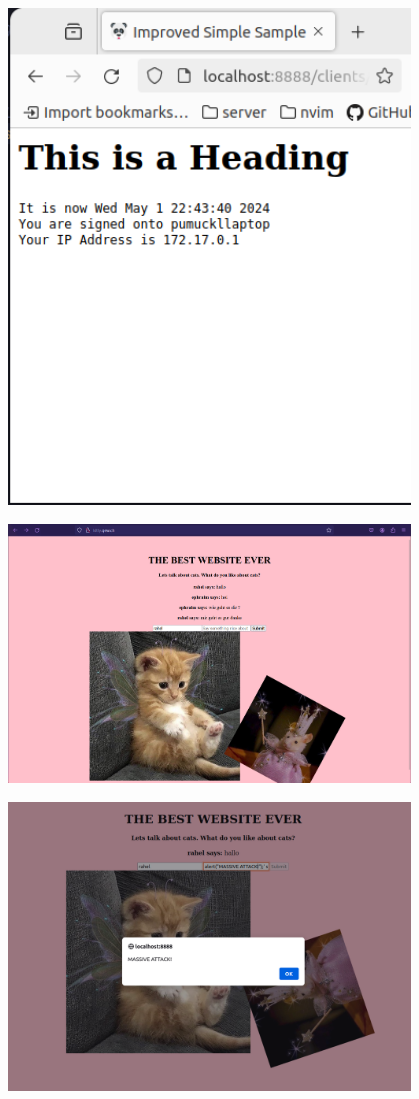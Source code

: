 \documentclass[aspectratio=169]{beamer}
\begin{document}
\begin{frame}[c]{}
  \centering
\includegraphics[width=0.8\textwidth,height=\textheight,keepaspectratio]{05_firstCGI.png} 
\end{frame}

\begin{frame}[c]{}
  \centering
\includegraphics[width=0.8\textwidth,height=\textheight,keepaspectratio]{06_ephi_app.png}
\end{frame}

\begin{frame}[c]{}
  \centering
\includegraphics[width=0.8\textwidth,height=\textheight,keepaspectratio]{07_css.png}
\end{frame}
\end{document}
